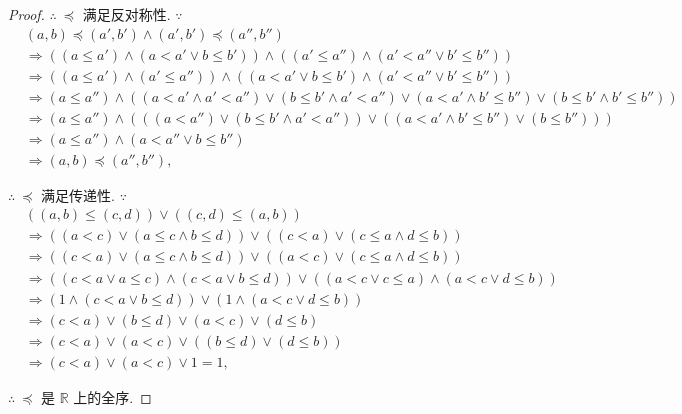 \documentclass{ctexart}
\begin{document}
\begin{proof}
    $\therefore\ \preceq$ 满足反对称性. $\because$
    \begin{align*}
        & (a,b)\preceq(a',b')\wedge(a',b')\preceq(a'',b'') \\
        & \Rightarrow((a\leq a')\wedge(a<a'\vee b\leq b'))\wedge((a'\leq a'')\wedge(a'<a''\vee b'\leq b'')) \\
        & \Rightarrow((a\leq a')\wedge(a'\leq a''))\wedge((a<a'\vee b\leq b')\wedge(a'<a''\vee b'\leq b'')) \\
        & \Rightarrow(a\leq a'')\wedge((a<a'\wedge a'<a'')\vee (b\leq b'\wedge a'<a'')\vee(a<a'\wedge b'\leq b'')\vee(b\leq b'\wedge b'\leq b'')) \\
        & \Rightarrow(a\leq a'')\wedge(((a<a'')\vee (b\leq b'\wedge a'<a''))\vee((a<a'\wedge b'\leq b'')\vee(b\leq b''))) \\
        & \Rightarrow(a\leq a'')\wedge(a<a''\vee b\leq b'') \\
        & \Rightarrow(a,b)\preceq(a'',b''),
    \end{align*}

    $\therefore\ \preceq$ 满足传递性. $\because$
    \begin{align*}
        & ((a,b)\leq(c,d))\vee((c,d)\leq(a,b)) \\
        & \Rightarrow((a<c)\vee(a\leq c\wedge b\leq d))\vee((c<a)\vee(c\leq a\wedge d\leq b)) \\
        & \Rightarrow((c<a)\vee(a\leq c\wedge b\leq d))\vee((a<c)\vee(c\leq a\wedge d\leq b)) \\
        & \Rightarrow((c<a\vee a\leq c)\wedge(c<a\vee b\leq d))\vee((a<c\vee c\leq a)\wedge(a<c\vee d\leq b)) \\
        & \Rightarrow(1\wedge(c<a\vee b\leq d))\vee(1\wedge(a<c\vee d\leq b)) \\
        & \Rightarrow(c<a)\vee(b\leq d)\vee(a<c)\vee(d\leq b) \\
        & \Rightarrow(c<a)\vee(a<c)\vee((b\leq d)\vee(d\leq b)) \\
        & \Rightarrow(c<a)\vee(a<c)\vee1=1,
    \end{align*}

    $\therefore\ \preceq$ 是 $\mathbb{R}$ 上的全序.
\end{proof}
\end{document}
